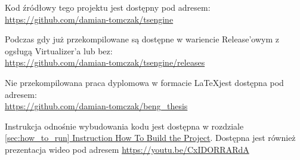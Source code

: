 Kod źródłowy tego projektu jest dostępny pod adresem:\\
\href{https://github.com/damian-tomczak/tsengine}{https://github.com/damian-tomczak/tsengine}

Podczas gdy już przekompilowane są dostępne w wariencie Release'owym z ogsługą Virtualizer'a lub bez:\\
\href{https://github.com/damian-tomczak/tsengine/releases}{https://github.com/damian-tomczak/tsengine/releases}

Nie przekompilowana praca dyplomowa w formacie \LaTeX jest dostępna pod adresem:\\
\href{https://github.com/damian-tomczak/beng_thesis}{https://github.com/damian-tomczak/beng\_thesis}

Instrukcja odnośnie wybudowania kodu jest dostępna w rozdziale \hyperref[sec:how_to_run]{\ref*{sec:how_to_run} Instruction How To Build the Project}. Dostępna jest również prezentacja wideo pod adresem \href{https://youtu.be/CxIDORRARdA}{https://youtu.be/CxIDORRARdA}
